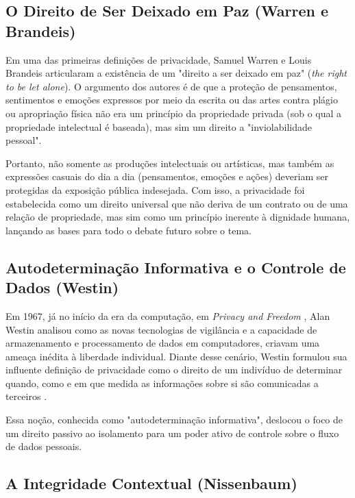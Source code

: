 \subsection{O Direito de Ser Deixado em Paz (Warren e Brandeis)}
\label{subsec:fund-warren-brandeis}

Em uma das primeiras definições de privacidade, Samuel Warren e Louis Brandeis \cite{WarrenBrandeis1890} articularam a existência de um "direito a ser deixado em paz" (\textit{the right to be let alone}). O argumento dos autores é de que a proteção de pensamentos, sentimentos e emoções expressos por meio da escrita ou das artes contra plágio ou apropriação física não era um princípio da propriedade privada (sob o qual a propriedade intelectual é baseada), mas sim um direito a "inviolabilidade pessoal".

Portanto, não somente as produções intelectuais ou artísticas, mas também as expressões casuais do dia a dia (pensamentos, emoções e ações) deveriam ser protegidas da exposição pública indesejada. Com isso, a privacidade foi estabelecida como um direito universal que não deriva de um contrato ou de uma relação de propriedade, mas sim como um princípio inerente à dignidade humana, lançando as bases para todo o debate futuro sobre o tema.

\subsection{Autodeterminação Informativa e o Controle de Dados (Westin)}
\label{subsec:fund-westin}

Em 1967, já no início da era da computação, em \textit{Privacy and Freedom} \cite{Westin1967}, Alan Westin analisou como as novas tecnologias de vigilância e a capacidade de armazenamento e processamento de dados em computadores, criavam uma ameaça inédita à liberdade individual. Diante desse cenário, Westin formulou sua influente definição de privacidade como o direito de um indivíduo de determinar quando, como e em que medida as informações sobre si são comunicadas a terceiros \cite{Westin1967}. 

Essa noção, conhecida como "autodeterminação informativa", deslocou o foco de um direito passivo ao isolamento para um poder ativo de controle sobre o fluxo de dados pessoais.

\subsection{A Integridade Contextual (Nissenbaum)}
\label{subsec:fund-nissenbaum}

